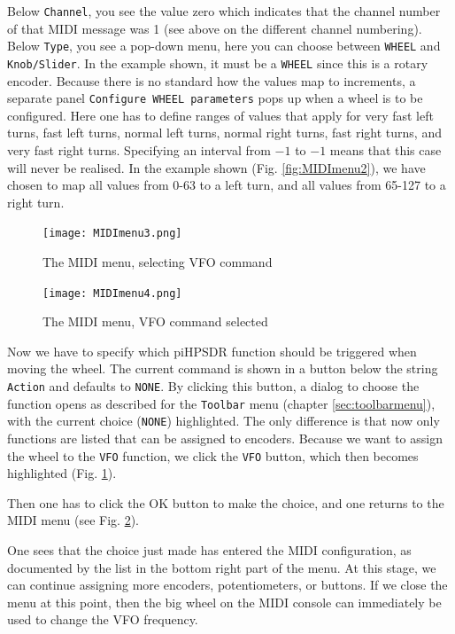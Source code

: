 \documentclass[12pt]{book}
\def\rett#1{\texttt{\color{red}#1}}
\def\bltt#1{\texttt{\color{blue}#1}}
\def\pH{pi\-HPSDR\xspace}
\begin{document}
Below \rett{Channel}, you see the value zero which
indicates that the channel number of that MIDI message was 1 (see above on the
different channel numbering). Below \rett{Type}, you see a pop-down menu, here
you can choose between \rett{WHEEL} and \rett{Knob/Slider}. In the example shown,
it must be a \rett{WHEEL} since this is a rotary encoder. Because there is no
standard how the values map to increments, a separate panel
\rett{Configure WHEEL parameters} pops up when a wheel is to be configured.
Here one has to define ranges of values that apply for very fast left turns,
fast left turns, normal left turns, normal right turns, fast right turns,
and very fast right turns. Specifying an interval from $-1$ to $-1$ means that
this case will never be realised. In the example shown (Fig. \ref{fig:MIDImenu2}),
we have chosen to map all values from 0-63 to a left turn, and all values from 65-127
to a right turn.
\begin{figure}[ht!]
\center
\texttt{[image: MIDImenu3.png]}
\caption{The MIDI menu, selecting VFO command}
\label{fig:MIDImenu3}
\end{figure}

\begin{figure}[ht!]
\center
\texttt{[image: MIDImenu4.png]}
\caption{The MIDI menu, VFO command selected}
\label{fig:MIDImenu4}
\end{figure}
Now we have to specify which \pH function should be triggered when moving the wheel.
The current command is shown in a button below the string \rett{Action} and defaults to \bltt{NONE}.
By clicking this button, a dialog to choose the function opens as described for the
\bltt{Toolbar} menu (chapter \ref{sec:toolbarmenu}), with the current choice (\bltt{NONE})
highlighted. The only difference is that now only functions are listed that can be
assigned to encoders.
Because we want to assign the wheel to the \bltt{VFO} function, we click
the \bltt{VFO} button, which then becomes highlighted (Fig. \ref{fig:MIDImenu3}).



Then one has to click the OK button to make the choice, and one returns to the
MIDI menu (see Fig. \ref{fig:MIDImenu4}).

One sees that the choice just made has entered the MIDI configuration, as documented by the
list in the bottom right part of the menu. At this stage, we can continue
assigning more encoders, potentiometers, or buttons. If we close the menu at
this point, then the big wheel on the MIDI console can immediately be used
to change the VFO frequency.
\end{document}
